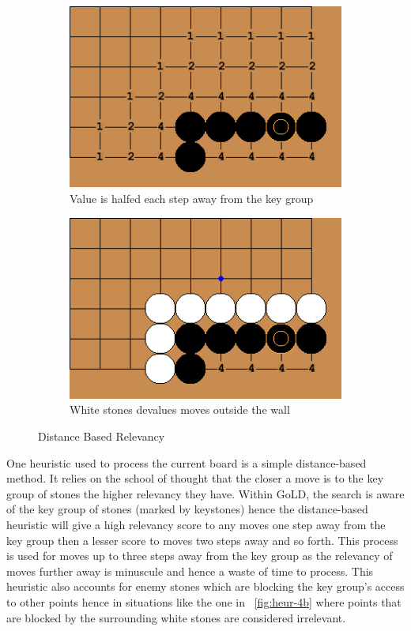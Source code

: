 \documentclass{l4proj}
\begin{document}
\begin{figure}[!ht]
\centering
\begin{subfigure}[b]{0.35\textwidth}
\centering
\includegraphics[width=\textwidth]{heur/4a.png}
\caption{Value is halfed each step away from the key group}
\label{fig:heur-4a}
\end{subfigure}
\begin{subfigure}[b]{0.35\textwidth}
\centering
\includegraphics[width=\textwidth]{heur/4b.png}
\caption{White stones devalues moves outside the wall}
\label{fig:heur-4b}
\end{subfigure}
\caption{Distance Based Relevancy}
\label{fig:heur-4}
\end{figure}

One heuristic used to process the current board is a simple distance-based method. It relies on the school of thought that the closer a move is to the key group of stones the higher relevancy they have. Within GoLD, the search is aware of the key group of stones (marked by keystones) hence the distance-based heuristic will give a high relevancy score to any moves one step away from the key group then a lesser score to moves two steps away and so forth. This process is used for moves up to three steps away from the key group as the relevancy of moves further away is minuscule and hence a waste of time to process. This heuristic also accounts for enemy stones which are blocking the key group's access to other points hence in situations like the one in ~\autoref{fig:heur-4b} where points that are blocked by the surrounding white stones are considered irrelevant.
\end{document}
